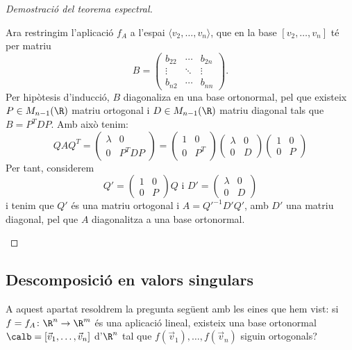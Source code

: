 \begin{proof}[Demostració del teorema espectral]
\begin{itemize}
    Ara restringim l'aplicació $f_A$ a l'espai $\langle v_2, \dots , v_n\rangle$, que en la base $[v_2, \dots , v_n]$ té per matriu
    \[
    B=\begin{pmatrix} b_{22} & \cdots & b_{2n} \\
    \vdots & \ddots & \vdots \\
    b_{n2} & \cdots  & b_{nn}
    \end{pmatrix} .
    \]
    Per hipòtesis d'inducció, $B$ diagonaliza en una base ortonormal, pel que existeix $P\in M_{n-1}(\R)$ matriu ortogonal i $D\in M_{n-1}(\R)$ matriu diagonal tals que $B=P^TDP$. Amb això tenim:
    \[
    QAQ^T=\left(\begin{array}{c|c}
        \lambda & 0 \\ \hline
        0 & P^T D P
    \end{array}\right)=
    \left(\begin{array}{c|c}
        1 & 0 \\ \hline
        0 & P^T
    \end{array}\right)
    \left(\begin{array}{c|c}
        \lambda & 0 \\ \hline
        0 & D 
    \end{array}\right)
    \left(\begin{array}{c|c}
        1 & 0 \\ \hline
        0 &  P
    \end{array}\right)
    \]
    Per tant, considerem
    \[
    Q'=\left(\begin{array}{c|c}
        1 & 0 \\ \hline
        0 &  P
    \end{array}\right) Q \text{ i }
    D'=\left(\begin{array}{c|c}
        \lambda & 0 \\ \hline
        0 & D 
    \end{array}\right)
    \]
    i tenim que $Q'$ és una matriu ortogonal i $A=Q'^{-1} D' Q'$, amb $D'$ una matriu diagonal, pel que $A$ diagonalitza a una base ortonormal.
    \end{itemize}
\end{proof}

\subsection{Descomposició en valors singulars}
A aquest apartat resoldrem la pregunta següent amb les eines que hem vist: si $f=f_A\colon \R^n \to \R^m$ és una aplicació lineal, existeix una base ortonormal $\calb=[\vec v_1, \dots, \vec v_n]$ d'$\R^n$ tal que $f(\vec v_1), \dots, f(\vec v_n)$ siguin ortogonals?


